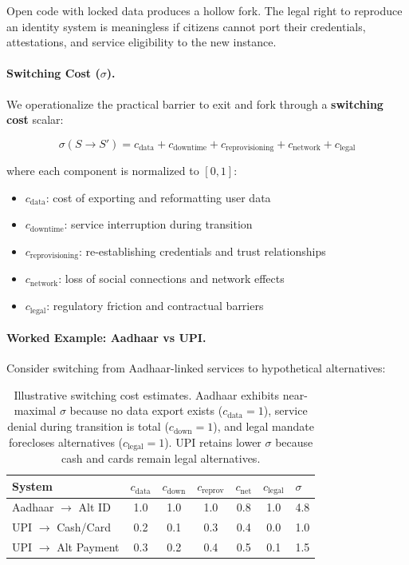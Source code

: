 \documentclass{article}
\begin{document}
Open code with locked data produces a hollow fork. The legal right to reproduce an identity system is meaningless if citizens cannot port their credentials, attestations, and service eligibility to the new instance.

\paragraph{Switching Cost ($\sigma$).} We operationalize the practical barrier to exit and fork through a \textbf{switching cost} scalar:

\begin{equation}
\sigma(S \to S') = c_{\text{data}} + c_{\text{downtime}} + c_{\text{reprovisioning}} + c_{\text{network}} + c_{\text{legal}}
\label{eq:switching-cost}
\end{equation}

where each component is normalized to $[0,1]$:
\begin{itemize}[noitemsep]
    \item $c_{\text{data}}$: cost of exporting and reformatting user data
    \item $c_{\text{downtime}}$: service interruption during transition
    \item $c_{\text{reprovisioning}}$: re-establishing credentials and trust relationships
    \item $c_{\text{network}}$: loss of social connections and network effects
    \item $c_{\text{legal}}$: regulatory friction and contractual barriers
\end{itemize}

\paragraph{Worked Example: Aadhaar vs UPI.} Consider switching from Aadhaar-linked services to hypothetical alternatives:

\begin{table}[htbp]
\centering
\small
\begin{tabular}{@{}lcccccl@{}}
\toprule
\textbf{System} & $c_{\text{data}}$ & $c_{\text{down}}$ & $c_{\text{reprov}}$ & $c_{\text{net}}$ & $c_{\text{legal}}$ & $\sigma$ \\
\midrule
Aadhaar $\to$ Alt ID & 1.0 & 1.0 & 1.0 & 0.8 & 1.0 & 4.8 \\
UPI $\to$ Cash/Card & 0.2 & 0.1 & 0.3 & 0.4 & 0.0 & 1.0 \\
UPI $\to$ Alt Payment & 0.3 & 0.2 & 0.4 & 0.5 & 0.1 & 1.5 \\
\bottomrule
\end{tabular}
\caption{Illustrative switching cost estimates. Aadhaar exhibits near-maximal $\sigma$ because no data export exists ($c_{\text{data}} = 1$), service denial during transition is total ($c_{\text{down}} = 1$), and legal mandate forecloses alternatives ($c_{\text{legal}} = 1$). UPI retains lower $\sigma$ because cash and cards remain legal alternatives.}
\label{tab:switching-example}
\end{table}
\end{document}
